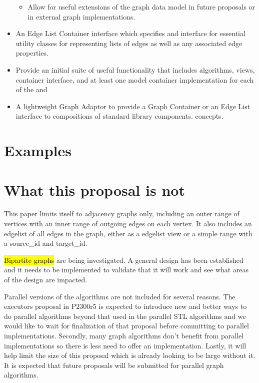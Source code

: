 \begin{itemize}
\begin{itemize}
\item Allow for useful extensions of the graph data model in future proposals or in external graph implementations. 
\end{itemize}
\item An Edge List Container interface which specifies and interface for essential utility classes for representing lists of edges as well as any associated edge properties.
\item Provide an initial suite of useful functionality that includes algorithms, views, container interface, and at least one 
model container implementation for each of the  and
\item A lightweight Graph Adaptor to provide a Graph Container or an Edge List interface to compositions of standard library components.
 concepts.
\end{itemize}

\section{Examples}



{\small
  
}



\section{What this proposal is  \textbf{not}}

This paper limits itself to adjacency graphs only, including an outer range of vertices with an inner range of outgoing edges on each vertex. It also includes an edgelist of all edges in the graph, either as a edgelist view or a simple range with a source\_id and target\_id. 

\hl{Bipartite graphs} are being investigated. A general design has been established and it needs to be implemented to validate that it will work and see what areas of the design are impacted.

Parallel versions of the algorithms are not included for several reasons. The executors proposal in P2300r5 \cite{REF_P2300r5} is expected to introduce new and better ways to do parallel algorithms beyond that used in the parallel STL algorithms and we would like to wait for finalization of that proposal before committing to parallel implementations. Secondly, many graph algorithms don't benefit from parallel implementations so there is less need to offer an implementation. Lastly, it will help limit the size of this proposal which is already looking to be large without it. It is expected that future proposals will be submitted for parallel graph algorithms. 


